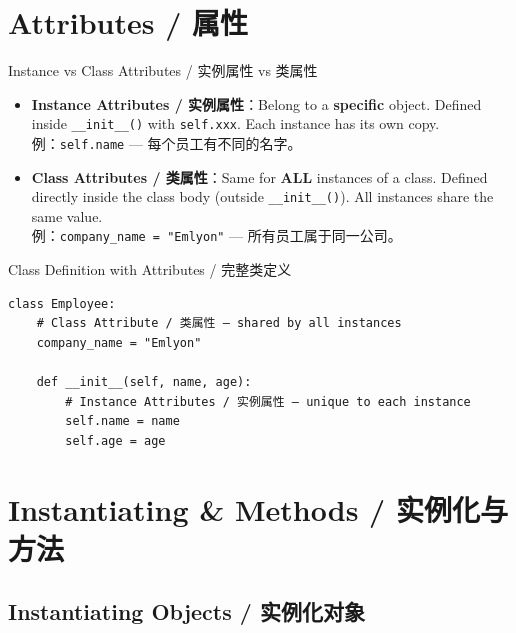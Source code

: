 \documentclass[11pt,a4paper]{article}
\begin{document}
\section{Attributes / 属性}

\begin{concept}{Instance vs Class Attributes / 实例属性 vs 类属性}
    \begin{itemize}[itemsep=0.8em]
        \item \textbf{Instance Attributes / 实例属性}：Belong to a \textbf{specific} object. Defined inside \texttt{\_\_init\_\_()} with \texttt{self.xxx}. Each instance has its own copy. \\
        例：\texttt{self.name} — 每个员工有不同的名字。
        \item \textbf{Class Attributes / 类属性}：Same for \textbf{ALL} instances of a class. Defined directly inside the class body (outside \texttt{\_\_init\_\_()}). All instances share the same value. \\
        例：\texttt{company\_name = "Emlyon"} — 所有员工属于同一公司。
    \end{itemize}
\end{concept}

\begin{examplebox}{Class Definition with Attributes / 完整类定义}
\begin{lstlisting}
class Employee:
    # Class Attribute / 类属性 — shared by all instances
    company_name = "Emlyon"

    def __init__(self, name, age):
        # Instance Attributes / 实例属性 — unique to each instance
        self.name = name
        self.age = age
\end{lstlisting}
\end{examplebox}

\section{Instantiating \& Methods / 实例化与方法}

\subsection{Instantiating Objects / 实例化对象}
\end{document}
